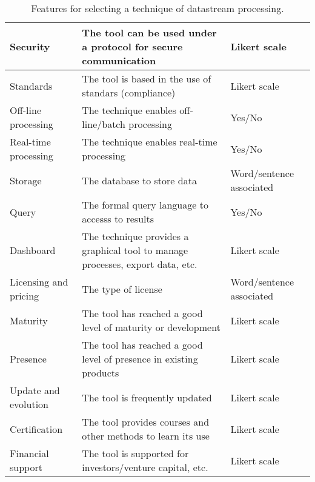 \begin{table}[!ht]
\begin{center}
\begin{tabular}[c]{|p{2.5cm}|p{5cm}|p{3cm}|}
  Security & The tool can be used under a protocol for secure communication & Likert scale  \\ \hline
  Standards & The tool is based in the use of standars (compliance) & Likert scale\ \\ \hline
  Off-line processing & The technique enables off-line/batch processing & Yes/No  \\ \hline
  Real-time processing & The technique enables real-time processing & Yes/No  \\ \hline
  Storage & The database to store data &  Word/sentence associated \\ \hline
  Query & The formal query language to accesss to results & Yes/No\\ \hline
  Dashboard & The technique provides a graphical tool to manage processes, export data, etc. & Likert scale\ \\ \hline
  Licensing and pricing & The type of license & Word/sentence associated \\ \hline
  Maturity & The tool has reached a good level of maturity or development & Likert scale\\ \hline
  Presence & The tool has reached a good level of presence in existing products & Likert scale\\ \hline
  Update and evolution & The tool is frequently updated & Likert scale\\ \hline
  Certification & The tool provides courses and other methods to learn its use & Likert scale\\ \hline
  Financial support & The tool is supported for investors/venture capital, etc. & Likert scale\\ \hline
\hline
\end{tabular}
\caption{Features for selecting a technique of datastream processing.}\label{features-techniques}
  \end{center}
\end{table} 


